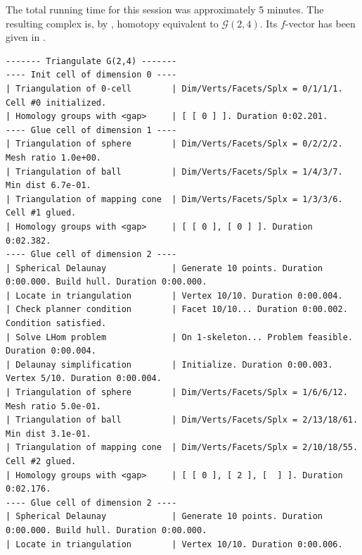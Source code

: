 \documentclass[a4paper,english,cleveref,autoref,thm-restate,nolineno]{socg-lipics-v2021}
\newcommand{\GG}{\mathcal G} %
\begin{document}
The total running time for this session was approximately 5 minutes.
The resulting complex is, by , homotopy equivalent to $\GG(2,4)$.
Its $f$-vector has been given in .


\begin{lstlisting}[style=consolestyle,caption={Console output of \Cref{alg:algorithm_full} on the Grassmannian $\GG(2,4)$},label={lst:execution}]
------- Triangulate G(2,4) -------
---- Init cell of dimension 0 ---- 
| Triangulation of 0-cell        | Dim/Verts/Facets/Splx = 0/1/1/1. Cell #0 initialized.
| Homology groups with <gap>     | [ [ 0 ] ]. Duration 0:02.201.
---- Glue cell of dimension 1 ---- 
| Triangulation of sphere        | Dim/Verts/Facets/Splx = 0/2/2/2. Mesh ratio 1.0e+00.
| Triangulation of ball          | Dim/Verts/Facets/Splx = 1/4/3/7. Min dist 6.7e-01.
| Triangulation of mapping cone  | Dim/Verts/Facets/Splx = 1/3/3/6. Cell #1 glued.
| Homology groups with <gap>     | [ [ 0 ], [ 0 ] ]. Duration 0:02.382.
---- Glue cell of dimension 2 ---- 
| Spherical Delaunay             | Generate 10 points. Duration 0:00.000. Build hull. Duration 0:00.000.
| Locate in triangulation        | Vertex 10/10. Duration 0:00.004.
| Check planner condition        | Facet 10/10... Duration 0:00.002. Condition satisfied.
| Solve LHom problem             | On 1-skeleton... Problem feasible. Duration 0:00.004.
| Delaunay simplification        | Initialize. Duration 0:00.003. Vertex 5/10. Duration 0:00.004.
| Triangulation of sphere        | Dim/Verts/Facets/Splx = 1/6/6/12. Mesh ratio 5.0e-01.
| Triangulation of ball          | Dim/Verts/Facets/Splx = 2/13/18/61. Min dist 3.1e-01.
| Triangulation of mapping cone  | Dim/Verts/Facets/Splx = 2/10/18/55. Cell #2 glued.
| Homology groups with <gap>     | [ [ 0 ], [ 2 ], [  ] ]. Duration 0:02.176.
---- Glue cell of dimension 2 ---- 
| Spherical Delaunay             | Generate 10 points. Duration 0:00.000. Build hull. Duration 0:00.000.
| Locate in triangulation        | Vertex 10/10. Duration 0:00.006.

\end{lstlisting}
\end{document}
